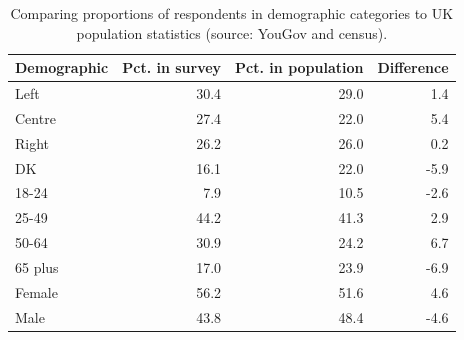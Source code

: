 \begin{table}[ht]
\centering
\begin{tabular}{lrrr}
  \hline
Demographic & Pct. in survey & Pct. in population & Difference \\ 
  \hline
Left & 30.4 & 29.0 & 1.4 \\ 
  Centre & 27.4 & 22.0 & 5.4 \\ 
  Right & 26.2 & 26.0 & 0.2 \\ 
  DK & 16.1 & 22.0 & -5.9 \\ 
   \hline
18-24 & 7.9 & 10.5 & -2.6 \\ 
  25-49 & 44.2 & 41.3 & 2.9 \\ 
  50-64 & 30.9 & 24.2 & 6.7 \\ 
  65 plus & 17.0 & 23.9 & -6.9 \\ 
   \hline
Female & 56.2 & 51.6 & 4.6 \\ 
  Male & 43.8 & 48.4 & -4.6 \\ 
   \hline
\end{tabular}
\caption{Comparing proportions of respondents in demographic categories to UK population statistics (source: YouGov and census).} 
\label{tab:represent}
\end{table}
